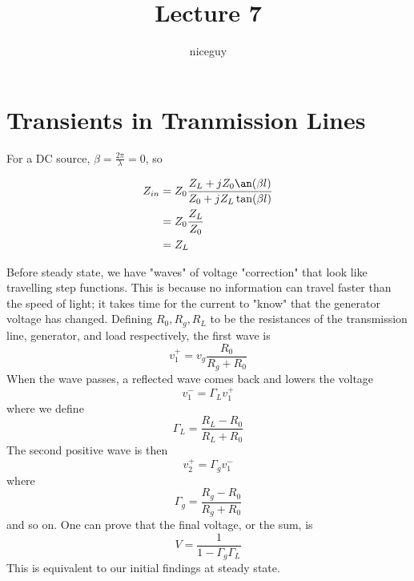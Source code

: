 \documentclass[12pt]{article}
\title{Lecture 7}
\author{niceguy}
\begin{document}
\maketitle

\section{Transients in Tranmission Lines}

For a DC source, $\beta = \frac{2\pi}{\lambda} = 0$, so

\begin{align*}
    Z_{in} &= Z_0 \frac{Z_L + jZ_0\an(\beta l)}{Z_0 + jZ_L \tan(\beta l)} \\
           &= Z_0 \frac{Z_L}{Z_0} \\
           &= Z_L
\end{align*}

Before steady state, we have "waves" of voltage "correction" that look like travelling step functions. This is because no information can travel faster than the speed of light; it takes time for the current to "know" that the generator voltage has changed. Defining $R_0, R_g, R_L$ to be the resistances of the transmission line, generator, and load respectively, the first wave is
$$v_1^+ = v_g \frac{R_0}{R_g + R_0}$$
When the wave passes, a reflected wave comes back and lowers the voltage
$$v_1^- = \Gamma_L v_1^+$$
where we define
$$\Gamma_L = \frac{R_L - R_0}{R_L + R_0}$$
The second positive wave is then
$$v_2^+ = \Gamma_g v_1^-$$
where
$$\Gamma_g = \frac{R_g - R_0}{R_g + R_0}$$
and so on. One can prove that the final voltage, or the sum, is
$$V = \frac{1}{1 - \Gamma_g\Gamma_L}$$
This is equivalent to our initial findings at steady state.
\end{document}
